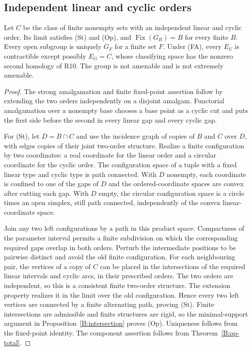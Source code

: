 \subsection{Independent linear and cyclic orders}

\begin{proposition}
\label{B:cyclic-supports}
Let $C$ be the class of finite nonempty sets with an independent
linear and cyclic order. Its limit satisfies (St) and (Op), and
$\operatorname{Fix}(G_B)=B$ for every finite $B$. Every open subgroup
is uniquely $G_F$ for a finite set $F$. Under (FA), every $E_U$ is
contractible except possibly $E_G=C$, whose classifying space has
the nonzero second homology of R10. The group is not amenable and
is not extremely amenable.
\end{proposition}
\begin{proof}
The strong amalgamation and finite fixed-point assertion follow by
extending the two orders independently on a disjoint amalgam.
Functorial amalgamation over a nonempty base chooses a base point
as a cyclic cut and puts the first side before the second in every
linear gap and every cyclic gap.

For (St), let $D=B\cap C$ and use the incidence graph of copies of
$B$ and $C$ over $D$, with edges copies of their joint two-order
structure. Realize a finite configuration by two coordinates: a
real coordinate for the linear order and a circular coordinate for
the cyclic order. The configuration space of a tuple with a fixed
linear type and cyclic type is path connected. With $D$ nonempty,
each coordinate is confined to one of the gaps of $D$ and the
ordered-coordinate spaces are convex after cutting each gap. With
$D$ empty, the circular configuration space is a circle times an
open simplex, still path connected, independently of the convex
linear-coordinate space.

Join any two left configurations by a path in this product space.
Compactness of the parameter interval permits a finite subdivision
on which the corresponding required gaps overlap in both orders.
Perturb the intermediate positions to be pairwise distinct and
avoid the old finite configuration. For each neighbouring pair,
the vertices of a copy of $C$ can be placed in the intersections
of the required linear intervals and cyclic arcs, in their
prescribed orders. The two orders are independent, so this is a
consistent finite two-order structure. The extension property
realizes it in the limit over the old configuration. Hence every
two left vertices are connected by a finite alternating path,
proving (St). Finite intersections are admissible and finite
structures are rigid, so the minimal-support argument in
Proposition~\ref{B:intersection} proves (Op). Uniqueness follows
from the fixed-point identity. The component assertion follows
from Theorem~\ref{B:op-total}.


\end{proof}
